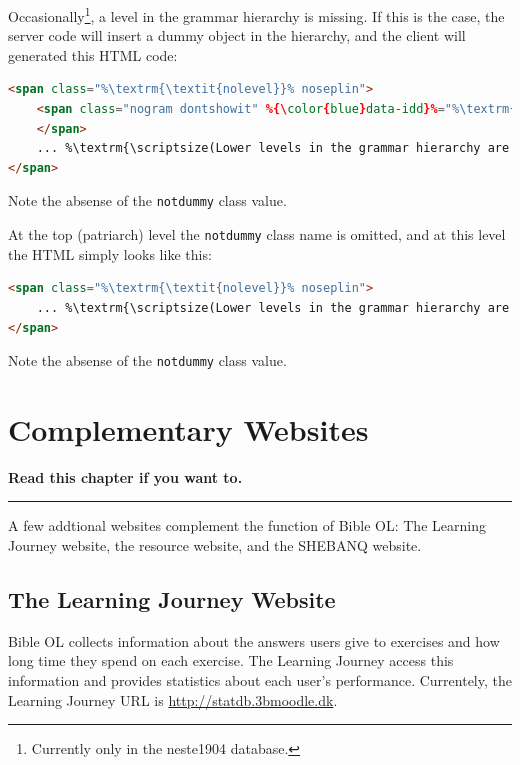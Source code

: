 \documentclass[11pt,oneside,a4paper]{memoir}
\newcommand*{\xmla}[1]{\texttt{#1}} %
\begin{document}
Occasionally\footnote{Currently only in the neste1904 database.}, a level in the grammar hierarchy
is missing. If this is the case, the server code will insert a dummy object in the hierarchy, and
the client will generated this HTML code:

\begin{lstlisting}[language=HTML]
<span class="%\textrm{\textit{nolevel}}% noseplin">
    <span class="nogram dontshowit" %{\color{blue}data-idd}%="%\textrm{\textit{ID\_D}}%">%\textrm{\textit{loctype}}%
    </span>
    ... %\textrm{\scriptsize(Lower levels in the grammar hierarchy are inserted here)}%
</span>
\end{lstlisting}

Note the absense of the \xmla{notdummy} class value.


At the top (patriarch) level the \xmla{notdummy} class name is omitted, and at this level the HTML
simply looks like this:

\begin{lstlisting}[language=HTML]
<span class="%\textrm{\textit{nolevel}}% noseplin">
    ... %\textrm{\scriptsize(Lower levels in the grammar hierarchy are inserted here)}%
</span>
\end{lstlisting}

Note the absense of the \xmla{notdummy} class value.


\chapter{Complementary Websites}

\textbf{Read this chapter if you want to.}
\plainbreak{3}


A few addtional websites complement the function of Bible OL: The Learning Journey website, the
resource website, and the SHEBANQ website.

\section{The Learning Journey Website}

Bible OL collects information about the answers users give to exercises and how long time they spend
on each exercise. The Learning Journey access this information and provides statistics about each
user's performance. Currentely, the Learning Journey URL is \url{http://statdb.3bmoodle.dk}.
\end{document}
